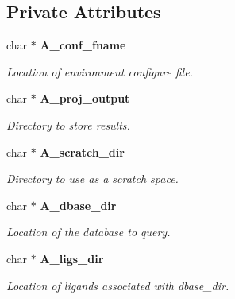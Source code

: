 \subsection*{Private Attributes}
\begin{CompactItemize}
\item 
char $\ast$ \bf{A\_\-conf\_\-fname}\label{classSimSite3D_1_1SearchParameters_3cb03731b1e4917864cade8bb39d7f95}

\begin{CompactList}\small\item\em Location of environment configure file. \item\end{CompactList}\item 
char $\ast$ \bf{A\_\-proj\_\-output}\label{classSimSite3D_1_1SearchParameters_b89a1895609e2d782727d5b81e70fff4}

\begin{CompactList}\small\item\em Directory to store results. \item\end{CompactList}\item 
char $\ast$ \bf{A\_\-scratch\_\-dir}\label{classSimSite3D_1_1SearchParameters_27e0256e5782174a8a5da589e84ef6da}

\begin{CompactList}\small\item\em Directory to use as a scratch space. \item\end{CompactList}\item 
char $\ast$ \bf{A\_\-dbase\_\-dir}\label{classSimSite3D_1_1SearchParameters_2cbe4df7b590f7cb0fff7584fcecf59b}

\begin{CompactList}\small\item\em Location of the database to query. \item\end{CompactList}\item 
char $\ast$ \bf{A\_\-ligs\_\-dir}\label{classSimSite3D_1_1SearchParameters_3dc1434fb48a7773cbe4fd247a87de77}

\begin{CompactList}\small\item\em Location of ligands associated with dbase\_\-dir. \item\end{CompactList}\end{CompactItemize}
